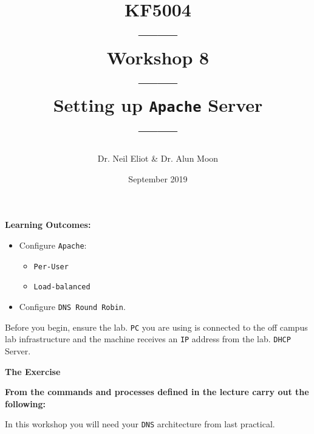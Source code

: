 \documentclass[11pt]{article}
\begin{document}
\author{Dr. Neil Eliot \& Dr. Alun Moon}
\title{KF5004\\------\\Workshop 8\\------\\Setting up \texttt{Apache} Server\\------}
\date{September 2019}
\maketitle

\newpage



\noindent\textbf{Learning Outcomes:}
\begin{itemize}
    \item Configure \texttt{Apache}:
        \begin{itemize}
            \item \texttt{Per-User}
            \item \texttt{Load-balanced}
        \end{itemize}
    \item Configure \texttt{DNS Round Robin}.
\end{itemize}


\begin{tcolorbox}[title={\textbf{Important:}}]
    Before you begin, ensure the lab. \texttt{PC} you are using is connected to the off campus lab infrastructure and the machine receives an \texttt{IP} address from the lab. \texttt{DHCP} Server.
\end{tcolorbox}
\newpage

\noindent\textbf{The Exercise}\\
\begin{tcolorbox}[colback=blue!20]
    \noindent\textbf{From the commands and processes defined in the lecture carry out the following:}
\end{tcolorbox}


\begin{tcolorbox}[title={\textbf{NOTE:}}]
    In this workshop you will need your \texttt{DNS} architecture from last practical.
\end{tcolorbox}
\end{document}

